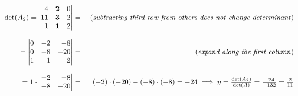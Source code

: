 \documentclass[8pt]{article} %
\begin{document}
\begin{description}
{			\[\begin{array}{rr}
			\det(A_2)=\begin{vmatrix*}[r]4&\mathbf{2}&0\\11&\mathbf{3}&2\\1&\mathbf{1}&2\end{vmatrix*}
			= &\mbox{ (\textit{subtracting third row from others does not change determinant})}\\\\
			=\begin{vmatrix*}[r]0&-2&-8\\0&-8&-20\\1&{1}&2\end{vmatrix*}
			= &\mbox{ (\textit{expand along the first column})}\\\\
			=1\cdot
			\begin{vmatrix*}[r]-2&-8\\-8&-20\end{vmatrix*}=&(-2)\cdot(-20)-(-8)\cdot(-8)=-24\implies y=\frac{\det(A_2)}{\det(A)}=
				\frac{-24}{-132}=\frac{2}{11}
			\end{array}\]

}
\end{description}
\end{document}
